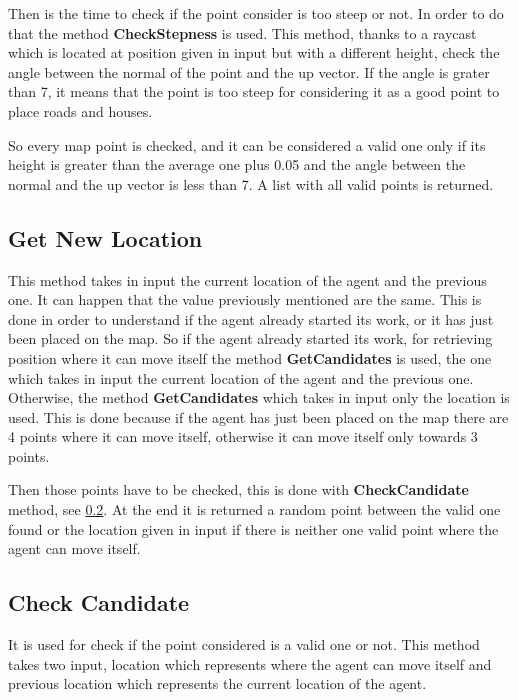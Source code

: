 \documentclass[12pt]{article}
\begin{document}
    Then is the time to check if the point consider is too steep or not. In order to do that the method \textbf{CheckStepness} is used. This method, thanks to a
    raycast which is located at position given in input but with a different height, check the angle between the normal of the point and the up vector. If the 
    angle is grater than 7, it means that the point is too steep for considering it as a good point to place roads and houses.
    
    So every map point is checked, and it can be considered a valid one only if its height is greater than the average one plus 0.05 and the angle between the normal 
    and the up vector is less than 7. A list with all valid points is returned.

    \subsection{Get New Location} \label{section:NewLocation}
    This method takes in input the current location of the agent and the previous one. It can happen that the value previously mentioned are the same. This is done in order
    to understand if the agent already started its work, or it has just been placed on the map. So if the agent already started its work, for retrieving position where it
    can move itself the method \textbf{GetCandidates} is used, the one which takes in input the current location of the agent and the previous one. Otherwise, the method
    \textbf{GetCandidates} which takes in input only the location is used. This is done because if the agent has just been placed on the map there are 4 points 
    where it can move itself, otherwise it can move itself only towards 3 points.
    
    Then those points have to be checked, this is done with \textbf{CheckCandidate} method, see \ref{section:CheckCandidate}. At the end it is returned a random point
    between the valid one found or the location given in input if there is neither one valid point where the agent can move itself.
     
    \subsection{Check Candidate} \label{section:CheckCandidate}
    It is used for check if the point considered is a valid one or not. This method takes two input, location which represents where the agent can move itself and 
    previous location which represents the current location of the agent.
\end{document}
